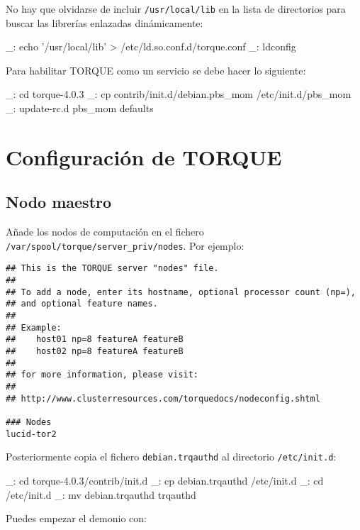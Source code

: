 No hay que olvidarse de incluir \texttt{/usr/local/lib} en la lista de directorios para buscar las librerías enlazadas dinámicamente:

\begin{bashcode}
_: echo '/usr/local/lib' > /etc/ld.so.conf.d/torque.conf
_: ldconfig
\end{bashcode}

Para habilitar TORQUE como un servicio se debe hacer lo siguiente:

\begin{bashcode}
_: cd torque-4.0.3
_: cp contrib/init.d/debian.pbs_mom /etc/init.d/pbs_mom
_: update-rc.d pbs_mom defaults
\end{bashcode}


\section{Configuración de TORQUE}


\subsection{Nodo maestro}
\label{anx:torque-conf-maestro}

Añade los nodos de computación en el fichero \texttt{/var/spool/torque/server\_priv/nodes}. Por ejemplo:

\begin{lstlisting}
## This is the TORQUE server "nodes" file. 
## 
## To add a node, enter its hostname, optional processor count (np=), 
## and optional feature names.
## 
## Example:
##    host01 np=8 featureA featureB 
##    host02 np=8 featureA featureB
## 
## for more information, please visit:
## 
## http://www.clusterresources.com/torquedocs/nodeconfig.shtml

### Nodes
lucid-tor2
\end{lstlisting}

Posteriormente copia el fichero \texttt{debian.trqauthd} al directorio \texttt{/etc/init.d}:

\begin{bashcode}
_: cd torque-4.0.3/contrib/init.d
_: cp debian.trqauthd /etc/init.d
_: cd /etc/init.d
_: mv debian.trqauthd trqauthd
\end{bashcode}

Puedes empezar el demonio con:

